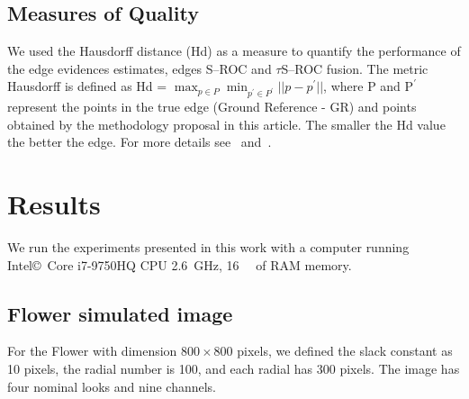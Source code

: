 \documentclass[remotesensing,article,submit,pdftex,moreauthors]{Definitions/mdpi}
\begin{document}
\subsection{Measures of Quality}
We used the Hausdorff distance (Hd) as a measure to quantify the performance of the edge evidences estimates, edges S--ROC and $\tau$S--ROC fusion. The metric Hausdorff is defined as Hd = $\max_{p\in P}\min_{p^{'}\in P^{'}}\vert\vert p-p^{'}\vert\vert$, where P and $\text{P}^{'}$ represent the points in the true edge (Ground Reference - GR) and points obtained by the methodology proposal in this article. The smaller the Hd value the better the edge. For more details see~\citep{taha_hanb} and~\citep{rey_sar_frery_del}. 
%
\section{Results}\label{sec:Results}
We run the experiments presented in this work with a computer running Intel\copyright\ Core i7-9750HQ CPU 
\SI{2.6}{\giga\hertz}, \SI{16}{\giga\byte} of RAM memory.
 \subsection{Flower simulated image}
For the Flower with dimension $800 \times 800$ pixels, we defined the slack constant as 10 pixels, the radial number is 100, and each radial has 300 pixels. The image has four nominal looks and nine channels.
\end{document}

